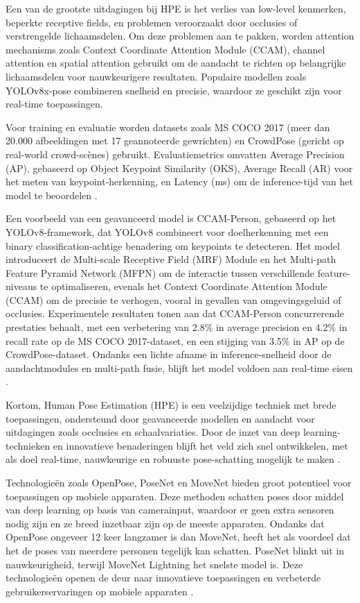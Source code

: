 Een van de grootste uitdagingen bij HPE is het verlies van low-level kenmerken, beperkte receptive fields, en problemen veroorzaakt door occlusies of verstrengelde lichaamsdelen. 
Om deze problemen aan te pakken, worden attention mechanisms zoals Context Coordinate Attention Module (CCAM), channel attention en spatial attention gebruikt om de aandacht te richten op belangrijke lichaamsdelen voor nauwkeurigere resultaten. 
Populaire modellen zoals YOLOv8x-pose combineren snelheid en precisie, waardoor ze geschikt zijn voor real-time toepassingen.

Voor training en evaluatie worden datasets zoals MS COCO 2017 (meer dan 20.000 afbeeldingen met 17 geannoteerde gewrichten) en CrowdPose (gericht op real-world crowd-scènes) gebruikt. 
Evaluatiemetrics omvatten Average Precision (AP), gebaseerd op Object Keypoint Similarity (OKS), Average Recall (AR) voor het meten van keypoint-herkenning, en Latency (ms) om de inference-tijd van het model te beoordelen \autocite{DongEtAl2024}.

Een voorbeeld van een geavanceerd model is CCAM-Person, gebaseerd op het YOLOv8-framework, dat YOLOv8 combineert voor doelherkenning met een binary classification-achtige benadering om keypoints te detecteren. Het model introduceert de Multi-scale Receptive Field (MRF) Module en het Multi-path Feature Pyramid Network (MFPN) om de interactie tussen verschillende feature-niveaus te optimaliseren, evenals het Context Coordinate Attention Module (CCAM) om de precisie te verhogen, vooral in gevallen van omgevingsgeluid of occlusies. 
Experimentele resultaten tonen aan dat CCAM-Person concurrerende prestaties behaalt, met een verbetering van 2.8\% in average precision en 4.2\% in recall rate op de MS COCO 2017-dataset, en een stijging van 3.5\% in AP op de CrowdPose-dataset. 
Ondanks een lichte afname in inference-snelheid door de aandachtmodules en multi-path fusie, blijft het model voldoen aan real-time eisen \autocite{DongEtAl2024}.

Kortom, Human Pose Estimation (HPE) is een veelzijdige techniek met brede toepassingen, ondersteund door geavanceerde modellen en aandacht voor uitdagingen zoals occlusies en schaalvariaties. 
Door de inzet van deep learning-technieken en innovatieve benaderingen blijft het veld zich snel ontwikkelen, met als doel real-time, nauwkeurige en robuuste pose-schatting mogelijk te maken \autocite{DongEtAl2024}.


Technologieën zoals OpenPose, PoseNet en MoveNet bieden groot potentieel voor toepassingen op mobiele apparaten. 
Deze methoden schatten poses door middel van deep learning op basis van camerainput, waardoor er geen extra sensoren nodig zijn en ze breed inzetbaar zijn op de meeste apparaten. 
Ondanks dat OpenPose ongeveer 12 keer langzamer is dan MoveNet, heeft het als voordeel dat het de poses van meerdere personen tegelijk kan schatten. PoseNet blinkt uit in nauwkeurigheid, terwijl MoveNet Lightning het snelste model is.
Deze technologieën openen de deur naar innovatieve toepassingen en verbeterde gebruikerservaringen op mobiele apparaten \autocite{BeomjunEtAl2022}.

